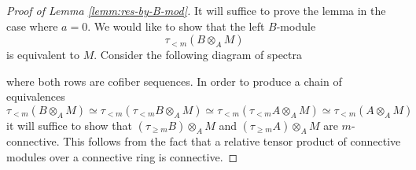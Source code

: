 \begin{proof}[Proof of Lemma \ref{lemm:res-by-B-mod}]
  It will suffice to prove the lemma in the case where $a=0$.
  We would like to show that the left $B$-module $$ \tau_{<m} ( B \otimes_A M) $$
  is equivalent to $M$. Consider the following diagram of spectra
  \begin{center}
  \end{center}
  where both rows are cofiber sequences.
  In order to produce a chain of equivalences
  $$ \tau_{<m}(B \otimes_A M) \simeq \tau_{<m}(\tau_{<m}B \otimes_A M) \simeq \tau_{<m}(\tau_{<m}A \otimes_A M) \simeq \tau_{<m}(A \otimes_A M) $$
  it will suffice to show that $(\tau_{\geq m}B) \otimes_A M$ and $(\tau_{\geq m}A) \otimes_A M$ are $m$-connective. This follows from the fact that a relative tensor product of connective modules over a connective ring is connective.
\end{proof}

